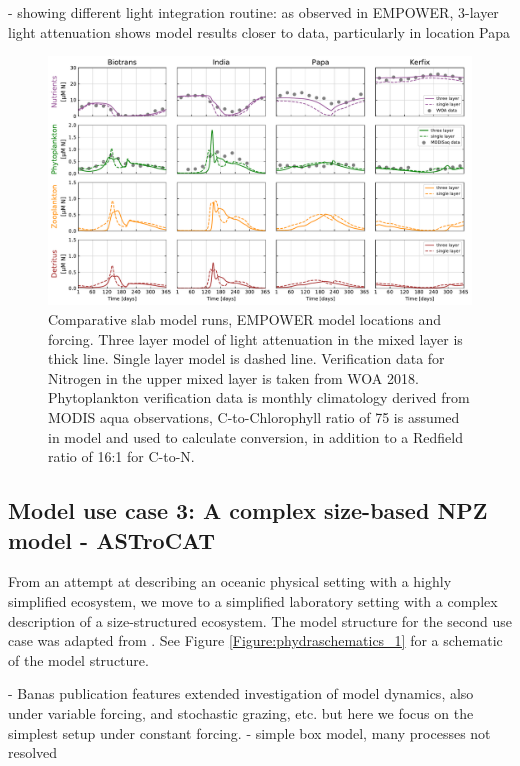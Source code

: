\documentclass[journal abbreviation, manuscript]{copernicus}
\begin{document}
- showing different light integration routine: as observed in EMPOWER, 3-layer light attenuation shows model results closer to data, particularly in location Papa



\begin{figure}[t]
\includegraphics[width=15cm]{Figures/firstdraft_plots/02_EMPOWER_lightcomp.pdf}
\caption{Comparative slab model runs, EMPOWER model locations and forcing. Three layer model of light attenuation in the mixed layer is thick line. Single layer model is dashed line. Verification data for Nitrogen in the upper mixed layer is taken from WOA 2018. Phytoplankton verification data is monthly climatology derived from MODIS aqua observations, C-to-Chlorophyll ratio of 75 is assumed in model and used to calculate conversion, in addition to a Redfield ratio of 16:1 for C-to-N.}
\label{Figure:ResultsEMPOWER}
\end{figure}



\subsection{Model use case 3: A complex size-based NPZ model - ASTroCAT}

From an attempt at describing an oceanic physical setting with a highly simplified ecosystem, we move to a simplified laboratory setting with a complex description of a size-structured ecosystem. The model structure for the second use case was adapted from \cite{Banas2011b}. See Figure \ref{Figure:phydraschematics_1} for a schematic of the model structure. 

- Banas publication features extended investigation of model dynamics, also under variable forcing, and stochastic grazing, etc. but here we focus on the simplest setup under constant forcing.
- simple box model, many processes not resolved
\end{document}
